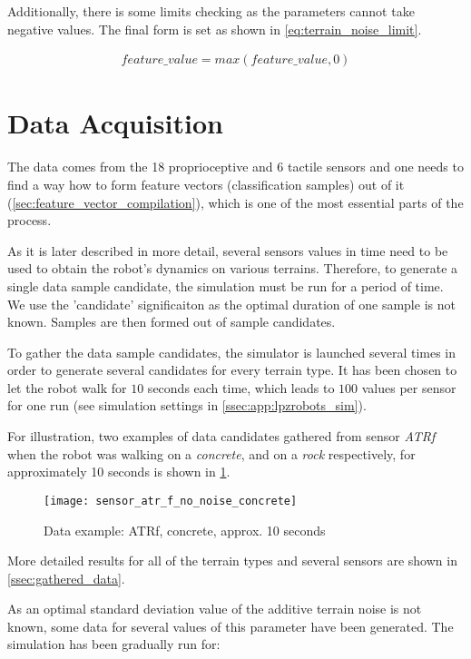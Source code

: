 Additionally, there is some limits checking as the parameters cannot take negative values. The final form is set as shown in \cref{eq:terrain_noise_limit}.

\begin{align} \label{eq:terrain_noise_limit}
feature\_value = max(feature\_value, 0)
\end{align}

\section{Data Acquisition} \label{sec:data_acquisition}
The data comes from the 18 proprioceptive and 6 tactile sensors and one needs to find a way how to form feature vectors (classification samples) out of it (\cref{sec:feature_vector_compilation}), which is one of the most essential parts of the process.

As it is later described in more detail, several sensors values in time need to be used to obtain the robot's dynamics on various terrains. Therefore, to generate a single data sample candidate, the simulation must be run for a period of time. We use the 'candidate' significaiton as the optimal duration of one sample is not known. Samples are then formed out of sample candidates.

To gather the data sample candidates, the simulator is launched several times in order to generate several candidates for every terrain type. It has been chosen to let the robot walk for $ 10 $ seconds each time, which leads to $ 100 $ values per sensor for one run (see simulation settings in \cref{ssec:app:lpzrobots_sim}).

For illustration, two examples of data candidates gathered from sensor \textit{ATRf} when the robot was walking on a \textit{concrete}, and on a \textit{rock} respectively, for approximately 10 seconds is shown in \cref{fig:data_example}.

\begin{figure}[H]
  \centering
  \texttt{[image: sensor\_atr\_f\_no\_noise\_concrete]}
  \caption{Data example: ATRf, concrete, approx. 10 seconds}
  \label{fig:data_example}
\end{figure}

More detailed results for all of the terrain types and several sensors are shown in \cref{ssec:gathered_data}. 

As an optimal standard deviation value of the additive terrain noise is not known, some data for several values of this parameter have been generated. The simulation has been gradually run for:

